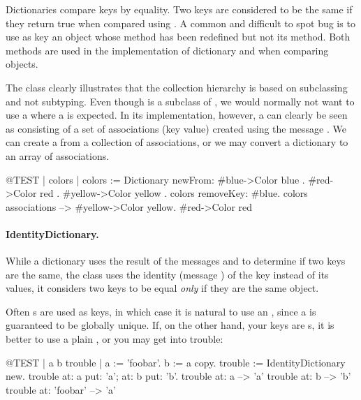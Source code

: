\documentclass[a4paper,10pt,twoside]{book}
\begin{document}
Dictionaries compare keys by equality. Two keys are considered to be the same if they return true when compared using \ct{=}. A common and difficult to spot bug is to use as key an object whose \ct{=} method has been redefined but not its  method. Both methods are used in the implementation of dictionary and when comparing objects.

The class  clearly illustrates that the collection hierarchy is based on subclassing and not subtyping.  Even though  is a subclass of , we would normally not want to use a  where a  is expected. In its implementation, however, a  can clearly be seen as consisting of a set of associations (key value) created using the message . We can create a  from a collection of associations, or we may convert a dictionary to an array of associations.

\begin{code}{@TEST | colors |}
colors := Dictionary newFrom: { #blue->Color blue . #red->Color red . #yellow->Color yellow }.
colors removeKey: #blue.
colors associations --> {#yellow->Color yellow. #red->Color red}
\end{code}

\paragraph{IdentityDictionary.}
While a dictionary uses the result of the messages \ct{=} and  to determine if two keys are the same, the class  uses the identity (message ) of the key instead of its values, \ie it considers two keys to be equal \emph{only} if they are the same object.

Often s are used as keys, in which case it is natural to use an , since a  is guaranteed to be globally unique.
If, on the other hand, your keys are s, it is better to use a plain , or you may get into trouble:

\begin{code}{@TEST | a b trouble |}
a := 'foobar'.
b := a copy.
trouble := IdentityDictionary new.
trouble at: a put: 'a'; at: b put: 'b'.
trouble at: a          --> 'a'
trouble at: b          --> 'b'
trouble at: 'foobar' --> 'a'
\end{code}
\end{document}
